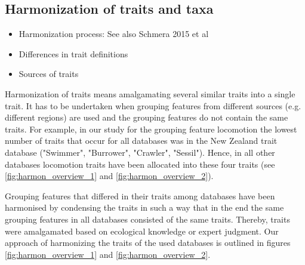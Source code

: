 \documentclass{article}
\begin{document}


\subsection{Harmonization of traits and taxa}
\begin{itemize}
    \item Harmonization process: See also Schmera 2015 et al 
    \item Differences in trait definitions
    \item Sources of traits
\end{itemize}

Harmonization of traits means amalgamating several similar traits into a single trait. 
It has to be undertaken when grouping features from different sources (e.g. different regions) are
used and the grouping features do not contain the same traits. 
For example, in our study for the grouping feature locomotion the lowest number of traits that occur
for all databases was in the New Zealand trait database ("Swimmer", "Burrower", "Crawler", "Sessil"). 
Hence, in all other databases locomotion traits have been allocated into these four traits (see \ref{fig:harmon_overview_1}
and \ref{fig:harmon_overview_2}).

Grouping features that differed in their traits among databases have been harmonised by 
condensing the traits in such a way that in the end the same grouping features in all databases
consisted of the same traits.  
Thereby, traits were amalgamated based on ecological knowledge or expert judgment. %
Our approach of harmonizing the traits of the used databases is outlined in figures 
\ref{fig:harmon_overview_1} and \ref{fig:harmon_overview_2}. 
\end{document}
